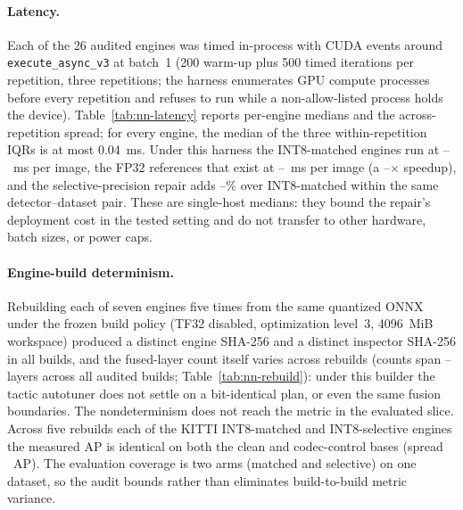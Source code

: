 \documentclass[10pt]{article}
\begin{document}
\paragraph{Latency.} Each of the 26 audited engines was timed in-process
with CUDA events around \texttt{execute\_async\_v3} at batch~1 (200 warm-up
plus 500 timed iterations per repetition, three repetitions; the harness
enumerates GPU compute processes before every repetition and refuses to run
while a non-allow-listed process holds the device).
Table~\ref{tab:nn-latency} reports per-engine medians and the
across-repetition spread; for every engine, the median of the three
within-repetition IQRs is at most 0.04~ms. Under this harness the INT8-matched engines run at
\nnLatIntEightMin--\nnLatIntEightMax~ms per image, the FP32 references that
exist at \nnLatFpMin--\nnLatFpMax~ms per image (a
\nnLatIntSpeedupMin--\nnLatIntSpeedupMax$\times$ speedup), and the
selective-precision repair adds
\nnLatSelOverheadMin--\nnLatSelOverheadMax\% over INT8-matched within the
same detector--dataset pair. These are single-host medians: they bound the
repair's deployment cost in the tested setting and do not transfer to other
hardware, batch sizes, or power caps.

\begin{table}[htbp]
\centering\scriptsize
\caption{Idle-gated batch-1 latency per engine (median of three repetitions,
each the median of 500 timed iterations). Timing covers engine execution on a
zero-filled input tensor and excludes preprocessing, data transfer, decoding,
and NMS. Rep spread: maximum minus minimum of the three repetition medians.}
\label{tab:nn-latency}
{\setlength{\tabcolsep}{3pt}}
\end{table}

\paragraph{Engine-build determinism.} Rebuilding each of seven engines five
times from the same quantized ONNX under the frozen build policy (TF32
disabled, optimization level~3, 4096~MiB workspace) produced a distinct
engine SHA-256 and a distinct inspector SHA-256 in all \nnRbTotal{} builds,
and the fused-layer count itself varies across rebuilds
(counts span \nnRbLayersMin--\nnRbLayersMax{} layers across all audited builds;
Table~\ref{tab:nn-rebuild}): under this builder the tactic autotuner does
not settle on a bit-identical plan, or even the same fusion boundaries. The nondeterminism does not reach the
metric in the evaluated slice. Across five rebuilds each of the KITTI
INT8-matched and INT8-selective engines the measured AP is identical on both the clean and
codec-control bases (spread \nnRbApSpread{}~AP). The evaluation
coverage is two arms (matched and selective) on one dataset, so the audit bounds rather than
eliminates build-to-build metric variance.
\end{document}
